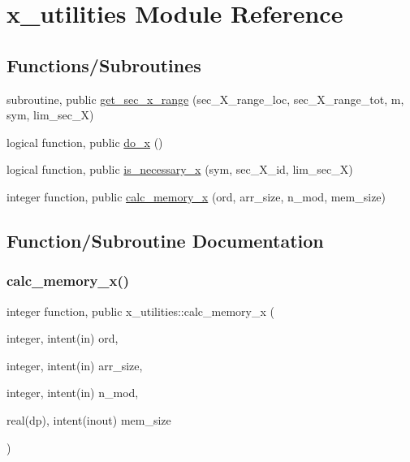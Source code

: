 \hypertarget{namespacex__utilities}{}\section{x\+\_\+utilities Module Reference}
\label{namespacex__utilities}
\subsection*{Functions/\+Subroutines}
\begin{DoxyCompactItemize}
\item 
subroutine, public \hyperlink{namespacex__utilities_a6072ddd1fd230758795ff320c75a1f6a}{get\+\_\+sec\+\_\+x\+\_\+range} (sec\+\_\+\+X\+\_\+range\+\_\+loc, sec\+\_\+\+X\+\_\+range\+\_\+tot, m, sym, lim\+\_\+sec\+\_\+X)
\item 
logical function, public \hyperlink{namespacex__utilities_adef8eab82f0fd670a7795c754cf9a8f9}{do\+\_\+x} ()
\item 
logical function, public \hyperlink{namespacex__utilities_a689aca7fedb49c43c5a65a18d557259f}{is\+\_\+necessary\+\_\+x} (sym, sec\+\_\+\+X\+\_\+id, lim\+\_\+sec\+\_\+X)
\item 
integer function, public \hyperlink{namespacex__utilities_a4d18921da77463d069346f1c7322b451}{calc\+\_\+memory\+\_\+x} (ord, arr\+\_\+size, n\+\_\+mod, mem\+\_\+size)
\end{DoxyCompactItemize}


\subsection{Function/\+Subroutine Documentation}
\mbox{\label{namespacex__utilities_a4d18921da77463d069346f1c7322b451}} 
\subsubsection{\texorpdfstring{calc\+\_\+memory\+\_\+x()}{calc\_memory\_x()}}
{\footnotesize\ttfamily integer function, public x\+\_\+utilities\+::calc\+\_\+memory\+\_\+x (\begin{DoxyParamCaption}\item[{integer, intent(in)}]{ord,  }\item[{integer, intent(in)}]{arr\+\_\+size,  }\item[{integer, intent(in)}]{n\+\_\+mod,  }\item[{real(dp), intent(inout)}]{mem\+\_\+size }\end{DoxyParamCaption})}



